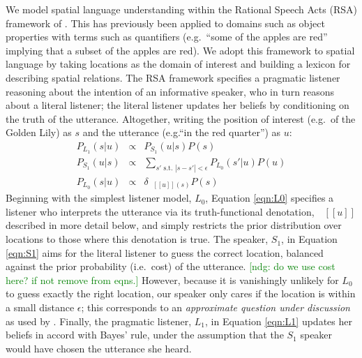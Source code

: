 \documentclass[10pt,letterpaper]{article}
\newcommand{\denote}[1]{\mbox{ $[\![ #1 ]\!]$}}
\newcommand{\ndg}[1]{\textcolor{Green}{[ndg: #1]}}
\begin{document}
We model spatial language understanding within the Rational Speech Acts (RSA) framework of .
This has previously been applied to domains such as object properties with terms such as quantifiers (e.g.~``some of the apples are red'' implying that a subset of the apples are red).
We adopt this framework to spatial language by taking locations as the domain of interest and building a lexicon for describing spatial relations. 
The RSA framework specifies a pragmatic listener reasoning about the intention of an informative speaker, who in turn reasons about a literal listener; the literal listener updates her beliefs by conditioning on the truth of the utterance.
Altogether, writing the position of interest (e.g.~of the Golden Lily) as $s$ and the utterance (e.g.``in the red quarter'') as $u$:
\begin{eqnarray}
P_{L_1}(s|u)&\propto&P_{S_1}(u | s) P(s) \label{eqn:L1}\\
P_{S_1}(u|s)&\propto&\sum_{s' \text{ s.t. } |s-s'|<\epsilon} P_{L_0}(s'|u) P(u)\label{eqn:S1}\\
P_{L_0}(s|u)&\propto& \delta_{\denote{u}(s)} P(s)\label{eqn:L0}
\end{eqnarray}
Beginning with the simplest listener model, $L_0$, Equation \ref{eqn:L0} specifies a listener who interprets the utterance via its truth-functional denotation, $\denote{u}$ described in more detail below, and simply restricts the prior distribution over locations to those where this denotation is true.
The speaker, $S_1$, in Equation \ref{eqn:S1} aims for the literal listener to guess the correct location, balanced against the prior probability (i.e.~cost) of the utterance. \ndg{do we use cost here? if not remove from eqns.}
However, because it is vanishingly unlikely for $L_0$ to guess exactly the right location, our speaker only cares if the location is within a small distance $\epsilon$; this corresponds to an \emph{approximate question under discussion} as used by .
Finally, the pragmatic listener, $L_1$, in Equation \ref{eqn:L1} updates her beliefs in accord with Bayes' rule, under the assumption that the $S_1$ speaker would have chosen the utterance she heard.
\end{document}
